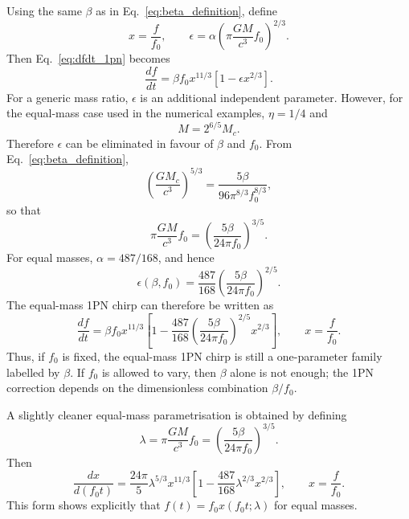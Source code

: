 \documentclass[11pt]{article}
\begin{document}
Using the same $\beta$ as in Eq.~\eqref{eq:beta_definition}, define
\begin{equation}
    x = \frac{f}{f_0},
    \qquad
    \epsilon
    =
    \alpha
    \left(
      \pi \frac{G M}{c^3} f_0
    \right)^{2/3}.
\end{equation}
Then Eq.~\eqref{eq:dfdt_1pn} becomes
\begin{equation}
    \frac{df}{dt}
    =
    \beta f_0 x^{11/3}
    \left[
      1 - \epsilon x^{2/3}
    \right].
\end{equation}
For a generic mass ratio, $\epsilon$ is an additional independent parameter.
However, for the equal-mass case used in the numerical examples, $\eta=1/4$ and
\begin{equation}
    M = 2^{6/5} M_c .
\end{equation}
Therefore $\epsilon$ can be eliminated in favour of $\beta$ and $f_0$.  From
Eq.~\eqref{eq:beta_definition},
\begin{equation}
    \left(
      \frac{G M_c}{c^3}
    \right)^{5/3}
    =
    \frac{5\beta}{96\pi^{8/3}f_0^{8/3}},
\end{equation}
so that
\begin{equation}
    \pi \frac{G M}{c^3} f_0
    =
    \left(
      \frac{5\beta}{24\pi f_0}
    \right)^{3/5}.
\end{equation}
For equal masses, $\alpha=487/168$, and hence
\begin{equation}
    \epsilon(\beta, f_0)
    =
    \frac{487}{168}
    \left(
      \frac{5\beta}{24\pi f_0}
    \right)^{2/5}.
    \label{eq:epsilon_equal_mass}
\end{equation}
The equal-mass 1PN chirp can therefore be written as
\begin{equation}
    \frac{df}{dt}
    =
    \beta f_0 x^{11/3}
    \left[
      1
      -
      \frac{487}{168}
      \left(
        \frac{5\beta}{24\pi f_0}
      \right)^{2/5}
      x^{2/3}
    \right],
    \qquad
    x = \frac{f}{f_0}.
    \label{eq:dfdt_1pn_equal_mass_beta}
\end{equation}
Thus, if $f_0$ is fixed, the equal-mass 1PN chirp is still a one-parameter
family labelled by $\beta$.  If $f_0$ is allowed to vary, then $\beta$ alone is
not enough; the 1PN correction depends on the dimensionless combination
$\beta/f_0$.

A slightly cleaner equal-mass parametrisation is obtained by defining
\begin{equation}
    \lambda
    =
    \pi \frac{G M}{c^3} f_0
    =
    \left(
      \frac{5\beta}{24\pi f_0}
    \right)^{3/5}.
\end{equation}
Then
\begin{equation}
    \frac{d x}{d(f_0 t)}
    =
    \frac{24\pi}{5}
    \lambda^{5/3}
    x^{11/3}
    \left[
      1
      -
      \frac{487}{168}
      \lambda^{2/3}x^{2/3}
    \right],
    \qquad
    x=\frac{f}{f_0}.
    \label{eq:dfdt_1pn_equal_mass_lambda}
\end{equation}
This form shows explicitly that $f(t)=f_0 x(f_0 t;\lambda)$ for equal masses.
\end{document}
